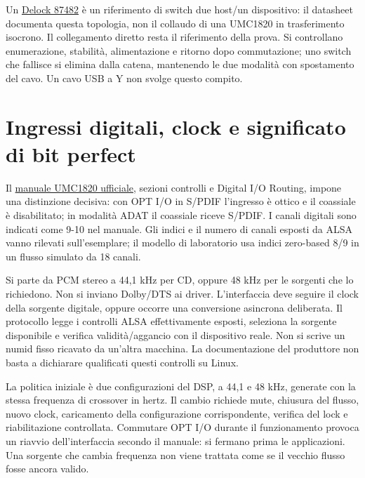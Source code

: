 \documentclass[
  italian,
  11pt,
  a4paper,
]{article}
\begin{document}
Un \href{https://www.delock.com/produkt/87482/pdf.html?sprache=en}{Delock 87482} è un
riferimento di switch due host/un dispositivo: il datasheet documenta questa topologia, non
il collaudo di una UMC1820 in trasferimento isocrono. Il collegamento diretto resta il
riferimento della prova. Si controllano enumerazione, stabilità, alimentazione e ritorno
dopo commutazione; uno switch che fallisce si elimina dalla catena, mantenendo le due
modalità con spostamento del cavo. Un cavo USB a Y non svolge questo compito.

\section{Ingressi digitali, clock e significato di bit
perfect}\label{ingressi-digitali-clock-e-significato-di-bit-perfect}

Il
\href{https://cdn-media.empowertribe.com/2b9a46d7e1104b78b8881f726c18a4d0/QSG_BE_0805-AAN_UMC1820_WW.pdf}{manuale
UMC1820 ufficiale}, sezioni controlli e Digital I/O Routing, impone una distinzione
decisiva: con OPT I/O in S/PDIF l'ingresso è ottico e il coassiale è disabilitato; in
modalità ADAT il coassiale riceve S/PDIF. I canali digitali sono indicati come 9-10 nel
manuale. Gli indici e il numero di canali esposti da ALSA vanno rilevati sull'esemplare; il
modello di laboratorio usa indici zero-based 8/9 in un flusso simulato da 18 canali.

Si parte da PCM stereo a 44,1 kHz per CD, oppure 48 kHz per le sorgenti che lo richiedono.
Non si inviano Dolby/DTS ai driver. L'interfaccia deve seguire il clock della sorgente
digitale, oppure occorre una conversione asincrona deliberata. Il protocollo legge i
controlli ALSA effettivamente esposti, seleziona la sorgente disponibile e verifica
validità/aggancio con il dispositivo reale. Non si scrive un numid fisso ricavato da
un'altra macchina. La documentazione del produttore non basta a dichiarare qualificati
questi controlli su Linux.

La politica iniziale è due configurazioni del DSP, a 44,1 e 48 kHz, generate con la stessa
frequenza di crossover in hertz. Il cambio richiede mute, chiusura del flusso, nuovo clock,
caricamento della configurazione corrispondente, verifica del lock e riabilitazione
controllata. Commutare OPT I/O durante il funzionamento provoca un riavvio dell'interfaccia
secondo il manuale: si fermano prima le applicazioni. Una sorgente che cambia frequenza non
viene trattata come se il vecchio flusso fosse ancora valido.
\end{document}
